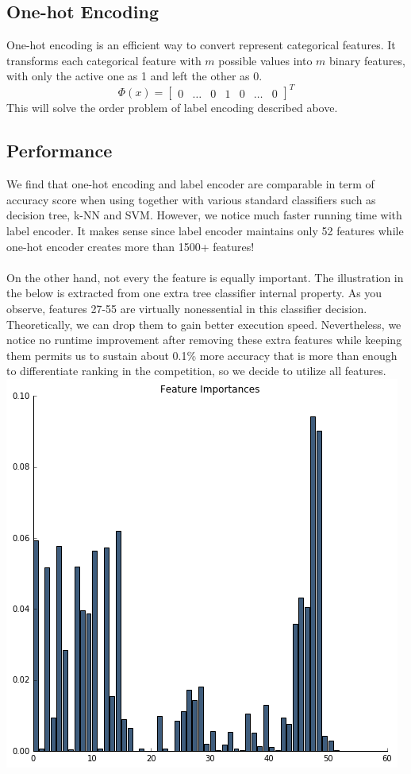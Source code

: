 \documentclass[conference]{IEEEtran}
\begin{document}
\subsection{One-hot Encoding}
One-hot encoding is an efficient way to convert represent categorical features. It transforms each categorical feature with $m$ possible values into $m$ binary features, with only the active one as 1 and left the other as 0. 
\begin{equation}
\Phi(x) = 
\begin{bmatrix}
    0 & \dots & 0 & 1 & 0 & \dots & 0
\end{bmatrix}^T
\end{equation}
\indent This will solve the order problem of label encoding described above. 
\subsection{Performance}
We find that one-hot encoding and label encoder are comparable in term of accuracy score when using together with various standard classifiers such as decision tree, k-NN and SVM. However, we notice much faster running time with label encoder. It makes sense since label encoder maintains only 52 features while one-hot encoder creates more than 1500+ features! \\ \\
On the other hand, not every the feature is equally important. The illustration in the below is extracted from one extra tree classifier internal property. As you observe, features 27-55 are virtually nonessential in this classifier decision. Theoretically, we can drop them to gain better execution speed. Nevertheless, we notice no runtime  improvement after removing these extra features while keeping them permits us to sustain about 0.1\% more accuracy that is more than enough to differentiate ranking in the competition, so we decide to utilize all features. 
\\
\includegraphics[scale=0.45]{report1.png}
\end{document}
